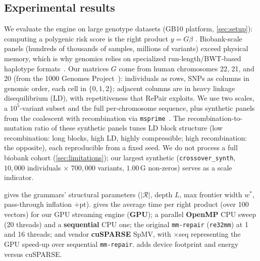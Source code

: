 \documentclass[twoside,leqno,twocolumn]{article}
\begin{document}
\subsection{Experimental results}
\label{sec:through-exp}

We evaluate the engine on large genotype datasets (GB10 platform, \cref{sec:setup}): computing a polygenic risk score is the right product $y=G\beta$ \cite{choi2020tutorial}. Biobank-scale panels (hundreds of thousands of samples, millions of variants) exceed physical memory, which is why genomics relies on specialized run-length/BWT-based haplotype formats~\cite{durbin2014pbwt,boucher-uk-biobank}. Our matrices $G$ come from human chromosomes 22, 21, and 20 (from the 1000 Genomes Project~\cite{1000genomes2015}): individuals as rows, SNPs as columns in genomic order, each cell in $\{0,1,2\}$; adjacent columns are in heavy linkage disequilibrium (LD), with repetitiveness that RePair exploits. We use two scales, a $10^5$-variant subset and the full per-chromosome sequence, plus synthetic panels from the coalescent with recombination via \texttt{msprime}~\cite{msprime2016,msprime2022}. The recombination-to-mutation ratio of these synthetic panels tunes LD block structure (low recombination: long blocks, high LD, highly compressible; high recombination: the opposite), each reproducible from a fixed seed. We do not process a full biobank cohort (\cref{sec:limitations}); our largest synthetic (\texttt{crossover\_synth}, $10{,}000$ individuals $\times$ $700{,}000$ variants, $1.00$\,G non-zeros) serves as a scale indicator.

 gives the grammars' structural parameters ($|\mathcal{R}|$, depth $L$, max frontier width $w^{*}$, pass-through inflation $+\text{pt}$).  gives the average time per right product (over 100 vectors) for our GPU streaming engine (\textbf{GPU}); a parallel \textbf{OpenMP} CPU sweep ($20$ threads) and a \textbf{sequential} CPU one; the original \texttt{mm-repair} (\texttt{re32mm}) at 1 and 16 threads; and vendor \textbf{cuSPARSE} SpMV, with $\times$seq representing the GPU speed-up over sequential \texttt{mm-repair}.  adds device footprint and energy versus cuSPARSE.

\begin{table}[t]
\caption{Structural figures, measured on the GB10 node. $|\mathcal{R}|$: RePair non-terminals; $L$: grammar depth; $w^{*}$: maximum live width after completion (the streaming-buffer size); $+\text{pt}$: pass-through nodes added by completion. $\text{K}=10^{3}$, $\text{M}=10^{6}$.}
\label{tab:geno_through}
\centering\footnotesize
\setlength{\tabcolsep}{4pt}

\end{table}
\end{document}
